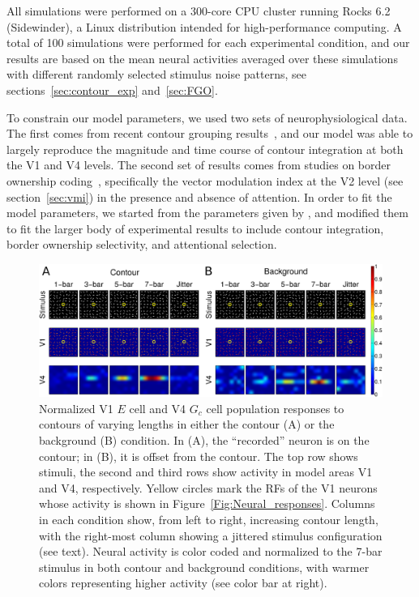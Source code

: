 All simulations were performed on a 300-core CPU cluster running Rocks
6.2 (Sidewinder), a Linux distribution intended for high-performance
computing.  A total of 100 simulations were performed for each
experimental condition, and our results are based on the mean neural
activities averaged over these simulations with different randomly
selected stimulus noise patterns, see sections~\ref{sec:contour_exp}
and~\ref{sec:FGO}.

To constrain our model parameters, we used two sets of
neurophysiological data. The first comes from recent contour grouping
results~\citep{Chen_etal14}, and our model was able to largely
reproduce the magnitude and time course of contour integration at both
the V1 and V4 levels. The second set of results comes from studies on
border ownership coding~\citep{Qiu_etal07}, specifically the vector
modulation index at the V2 level (see section~\ref{sec:vmi}) in the
presence and absence of attention. In order to fit the model
parameters, we started from the parameters given by
\cite{Mihalas_etal11b}, and modified them to fit the larger body of
experimental results to include contour integration, border ownership
selectivity, and attentional selection.

\begin{figure}[t]
\centering
\includegraphics[width=\textwidth]{Contour/figs/Fig3.eps}
\makeatletter
\let\@currsize\normalsize
\caption[V1 and V4 population responses to contours]{Normalized V1 $E$ cell and V4 $G_c$ cell population responses to contours of varying lengths in either the contour (A) or the background (B) condition. In (A), the ``recorded'' neuron is on the contour; in (B), it is offset from the contour. The top row shows stimuli, the second and third rows show activity in model areas V1 and V4, respectively. Yellow circles mark the RFs of the V1 neurons whose activity is shown in Figure~\ref{Fig:Neural_responses}. 
Columns in each condition show, from left to right, increasing contour length, with the right-most column showing a jittered stimulus configuration (see text). Neural activity is color coded and normalized to the 7-bar stimulus in both contour and background conditions, with warmer colors representing higher activity (see color bar at right).}
\label{Fig:Contour_Results}
\end{figure}

